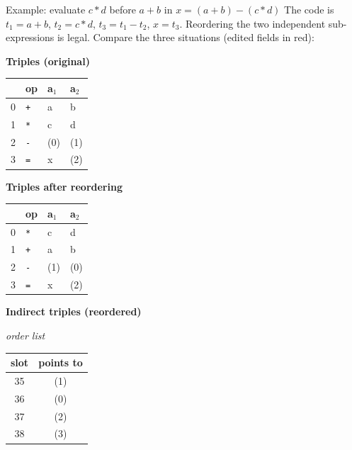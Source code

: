 \documentclass[11pt,a4paper]{article}
\begin{document}
\begin{examplebox}{Example: evaluate $c*d$ before $a+b$ in $x = (a+b)-(c*d)$}
The code is $t_1=a+b$, $t_2=c*d$, $t_3=t_1-t_2$, $x=t_3$. Reordering the two independent sub-expressions is legal. Compare the three situations (edited fields in \textcolor{red!70!black}{red}):

\medskip
\begin{center}
\small
\begin{minipage}[t]{0.30\textwidth}
\textbf{Triples (original)}

\smallskip
\begin{tabular}{@{}c l l l@{}}
\toprule
 & op & a$_1$ & a$_2$ \\ \midrule
0 & \texttt{+} & a & b \\
1 & \texttt{*} & c & d \\
2 & \texttt{-} & (0) & (1) \\
3 & \texttt{=} & x & (2) \\ \bottomrule
\end{tabular}
\end{minipage}\hfill
\begin{minipage}[t]{0.33\textwidth}
\textbf{Triples after reordering}

\smallskip
\begin{tabular}{@{}c l l l@{}}
\toprule
 & op & a$_1$ & a$_2$ \\ \midrule
0 & \textcolor{red!70!black}{\texttt{*}} & \textcolor{red!70!black}{c} & \textcolor{red!70!black}{d} \\
1 & \textcolor{red!70!black}{\texttt{+}} & \textcolor{red!70!black}{a} & \textcolor{red!70!black}{b} \\
2 & \texttt{-} & \textcolor{red!70!black}{(1)} & \textcolor{red!70!black}{(0)} \\
3 & \texttt{=} & x & (2) \\ \bottomrule
\end{tabular}
\end{minipage}\hfill
\begin{minipage}[t]{0.33\textwidth}
\textbf{Indirect triples (reordered)}

\smallskip
\emph{order list}\\[2pt]
\begin{tabular}{@{}c c@{}}
\toprule
slot & points to \\ \midrule
35 & \textcolor{red!70!black}{(1)} \\
36 & \textcolor{red!70!black}{(0)} \\
37 & (2) \\
38 & (3) \\ \bottomrule
\end{tabular}


\end{minipage}
\end{center}
\end{examplebox}
\end{document}
